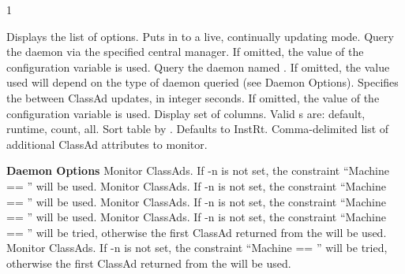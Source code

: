 \begin{ManPage}{\label{man-condor-top}}{1}
\begin{Options}
            {Displays the list of options.}
            {Puts  in to a live, continually updating mode.}
            {Query the daemon via the specified central manager. If
              omitted, the value of the configuration variable
               is used.}
            {Query the daemon named . If omitted, the value
              used will depend on the type of daemon queried (see
              Daemon Options).}
            {Specifies the  between ClassAd updates, in
              integer seconds. If omitted, the value of the
              configuration variable  is
              used.}
            {Display  set of columns. Valid s are: 
              default, runtime, count, all.}
            {Sort table by . Defaults to InstRt.}
            {Comma-delimited list of additional ClassAd attributes
              to monitor.}

    \textbf{Daemon Options}
            {Monitor  ClassAds. If -n is not set,
              the constraint ``Machine == ''
              will be used.}
            {Monitor  ClassAds. If -n is not set,
              the constraint ``Machine == ''
              will be used.}
            {Monitor  ClassAds. If -n is not set,
              the constraint ``Machine == ''
              will be used.}
            {Monitor  ClassAds. If -n is not set,
              the constraint ``Machine == ''
              will be tried, 
              otherwise the first  ClassAd
              returned from the  will be used.}
            {Monitor  ClassAds. If -n is not set,
              the constraint ``Machine == ''
              will be tried, 
              otherwise the first  ClassAd
              returned from the  will be used.}

\end{Options}

\end{ManPage}
